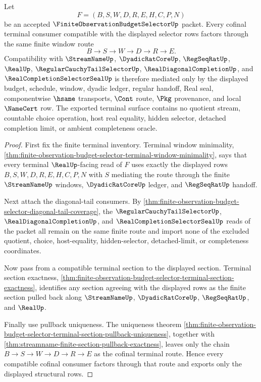 \begin{theorem}
\label{thm:finite-observation-budget-selector-terminal-cofinal-window-coverage}
Let
$$
F=(B,S,W,D,R,E,H,C,P,N)
$$
be an accepted $\FiniteObservationBudgetSelectorUp$ packet. Every cofinal terminal consumer compatible with the displayed selector rows factors through the same finite window route
$$
B \to S \to W \to D \to R \to E.
$$
Compatibility with $\StreamNameUp$, $\DyadicRatCoreUp$, $\RegSeqRatUp$, $\RealUp$, $\RegularCauchyTailSelectorUp$, $\RealDiagonalCompletionUp$, and $\RealCompletionSelectorSealUp$ is therefore mediated only by the displayed budget, schedule, window, dyadic ledger, regular handoff, Real seal, componentwise $\hsame$ transports, $\Cont$ route, $\Pkg$ provenance, and local $\NameCert$ row. The exported terminal surface contains no quotient stream, countable choice operation, host real equality, hidden selector, detached completion limit, or ambient completeness oracle.
\end{theorem}
\begin{proof}
First fix the finite terminal inventory. Terminal window minimality, \autoref{thm:finite-observation-budget-selector-terminal-window-minimality}, says that every terminal $\RealUp$-facing read of $F$ uses exactly the displayed rows $B,S,W,D,R,E,H,C,P,N$ with $S$ mediating the route through the finite $\StreamNameUp$ windows, $\DyadicRatCoreUp$ ledger, and $\RegSeqRatUp$ handoff.

Next attach the diagonal-tail consumers. By \autoref{thm:finite-observation-budget-selector-diagonal-tail-coverage}, the $\RegularCauchyTailSelectorUp$, $\RealDiagonalCompletionUp$, and $\RealCompletionSelectorSealUp$ reads of the packet all remain on the same finite route and import none of the excluded quotient, choice, host-equality, hidden-selector, detached-limit, or completeness coordinates.

Now pass from a compatible terminal section to the displayed section. Terminal section exactness, \autoref{thm:finite-observation-budget-selector-terminal-section-exactness}, identifies any section agreeing with the displayed rows as the finite section pulled back along $\StreamNameUp$, $\DyadicRatCoreUp$, $\RegSeqRatUp$, and $\RealUp$.

Finally use pullback uniqueness. The uniqueness theorem \autoref{thm:finite-observation-budget-selector-terminal-section-pullback-uniqueness}, together with \autoref{thm:streamname-finite-section-pullback-exactness}, leaves only the chain $B \to S \to W \to D \to R \to E$ as the cofinal terminal route. Hence every compatible cofinal consumer factors through that route and exports only the displayed structural rows.
\end{proof}

